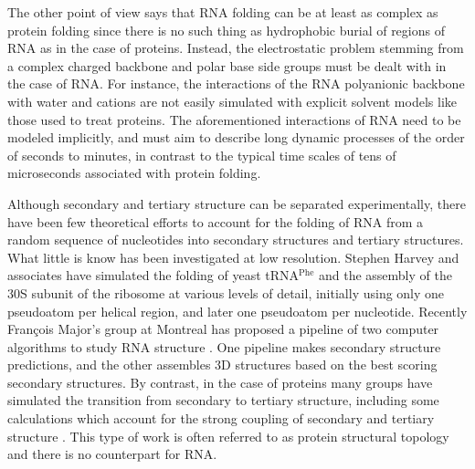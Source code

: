 The  other point of  view says  that RNA  folding can  be at  least as
complex as protein folding \cite{moore1999a, sorin2004} since there is
no such thing  as hydrophobic burial of regions of RNA  as in the case
of  proteins.   Instead, the  electrostatic  problem  stemming from  a
complex charged backbone and polar base side groups must be dealt with
in the case of RNA.
For instance,  the interactions of  the RNA polyanionic  backbone with
water  and cations  \cite{klein2004a}  are not  easily simulated  with
explicit   solvent  models   like those used to treat   proteins.  The
aforementioned interactions of RNA  need to be modeled implicitly, and
must aim to describe long dynamic processes of the order of seconds to
minutes,  in  contrast   to  the  typical  time  scales   of  tens  of
microseconds associated with protein folding.

Although   secondary   and  tertiary   structure   can  be   separated
experimentally, there have been few theoretical efforts to account for
the  folding  of  RNA  from  a random  sequence  of  nucleotides  into
secondary structures and tertiary  structures. What little is know has
been  investigated at  low resolution.  Stephen Harvey  and associates
have   simulated   the   folding   of   yeast   tRNA$^{\textrm{Phe}}$
\cite{malhotra1990}  and  the  assembly  of  the 30S  subunit  of  the
ribosome \cite{stagg2003} at various levels of detail, initially using
only one pseudoatom  per helical region, and later  one pseudoatom per
nucleotide.  Recently  Fran\c{c}ois  Major's  group  at  Montreal  has
proposed a pipeline of two  computer algorithms to study RNA structure
\cite{parisien2008}.   One    pipeline   makes   secondary   structure
predictions, and the  other assembles 3D structures based  on the best
scoring secondary structures.
By contrast,  in the case of  proteins many groups  have simulated the
transition  from  secondary  to  tertiary  structure,  including  some
calculations which  account for the  strong coupling of  secondary and
tertiary  structure   \cite{westhead1999,  gerstein2003,  meiler2003}.
This type of work is  often referred to as protein structural topology
and there is no counterpart for RNA.

